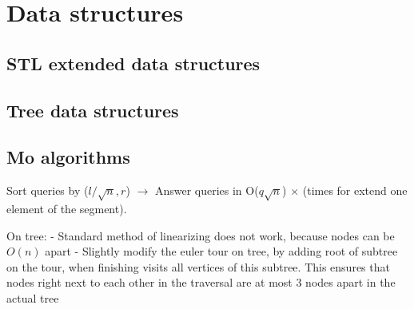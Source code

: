 \chapter{Data structures}

\section{STL extended data structures}

\section{Tree data structures}
\section{Mo algorithms}
    Sort queries by ($l / \sqrt{n} , r $)
    $\rightarrow$ Answer queries in O($q \sqrt{n} $) $\times$ (times for extend one element of the segment).

    On tree:
    - Standard method of linearizing does not work, because nodes can be $O(n)$ apart
    - Slightly modify the euler tour on tree, by adding root of subtree on the tour, when finishing visits all vertices of this subtree. This ensures that nodes right next to each other in the traversal are at most 3 nodes apart in the actual tree


